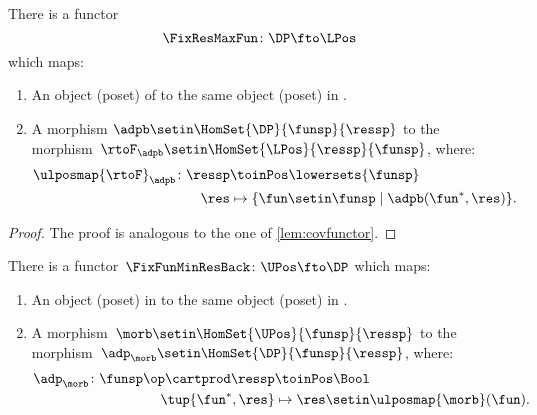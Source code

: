 \begin{lemma}
    \label{lem:confunctor}
    There is a functor
    \begin{equation}
        \FixResMaxFun\colon \DP \fto \LPos
    \end{equation}
    which maps:
    \begin{enumerate}
        \item An object (poset) of \DP to the same object (poset) in \LPos.
        \item A morphism $\adpb \setin \HomSet{\DP}{\funsp}{\ressp}$ to the morphism~$\rtoF_\adpb\setin \HomSet{\LPos}{\ressp}{\funsp}$, where:
              \begin{equation*}
                  \begin{aligned}
                      \ulposmap{\rtoF}_\adpb\colon \ressp & \toinPos \lowersets{\funsp} \\
                      \res                                & \mapsto \{ \fun \setin \funsp \mid \adpb(\fun^*,\res)\}.
                  \end{aligned}
              \end{equation*}
    \end{enumerate}
\end{lemma}

\begin{proof}
    The proof is analogous to the one of \cref{lem:covfunctor}.
\end{proof}

\begin{lemma}
    \label{lem:covfunctorback}
    There is a functor~$\FixFunMinResBack\colon \UPos \fto \DP$ which maps:
    \begin{enumerate}
        \item An object (poset) in \UPos to the same object (poset) in \DP.
        \item A morphism~$\morb\setin \HomSet{\UPos}{\funsp}{\ressp}$ to the morphism~$\adp_\morb \setin \HomSet{\DP}{\funsp}{\ressp}$, where:
              \begin{equation}
                  \begin{aligned}
                      \adp_\morb\colon \funsp\op \cartprod \ressp & \toinPos \Bool \\
                      \tup{\fun^*,\res}                           & \mapsto \res \setin \ulposmap{\morb}(\fun).
                  \end{aligned}
              \end{equation}
    \end{enumerate}
\end{lemma}

